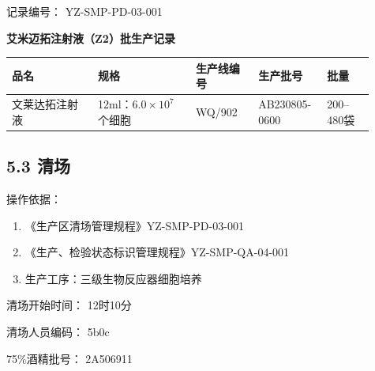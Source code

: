 \documentclass[UTF8,10pt,a4paper,fontset=fandol]{ctexart}
\newcommand{\fieldvalue}[1]{#1}
\newcommand{\handwritten}[1]{#1}
\begin{document}
记录编号：
\fieldvalue{YZ-SMP-PD-03-001}

\begin{center}
\textbf{艾米迈拓注射液（Z2）批生产记录}
\end{center}

\begin{tabular}{|p{0.22\linewidth}|p{0.25\linewidth}|p{0.16\linewidth}|p{0.16\linewidth}|p{0.12\linewidth}|}
\hline
品名 & 规格 & 生产线编号 & 生产批号 & 批量\\
\hline
\fieldvalue{文莱达拓注射液} &
\fieldvalue{12ml：$6.0\times10^{7}$个细胞} &
\fieldvalue{\handwritten{WQ/902}} &
\fieldvalue{\handwritten{AB230805-0600}} &
\fieldvalue{200--480袋}\\
\hline
\end{tabular}

\subsection*{5.3 清场}

操作依据：

\begin{enumerate}
\item 《生产区清场管理规程》\hfill YZ-SMP-PD-03-001
\item 《生产、检验状态标识管理规程》\hfill YZ-SMP-QA-04-001
\item 生产工序：三级生物反应器细胞培养
\end{enumerate}

清场开始时间：
\fieldvalue{\handwritten{12时10分}}

清场人员编码：
\fieldvalue{\handwritten{5b0c}}

\hfill 75\%酒精批号：
\fieldvalue{\handwritten{2A506911}}
\end{document}
